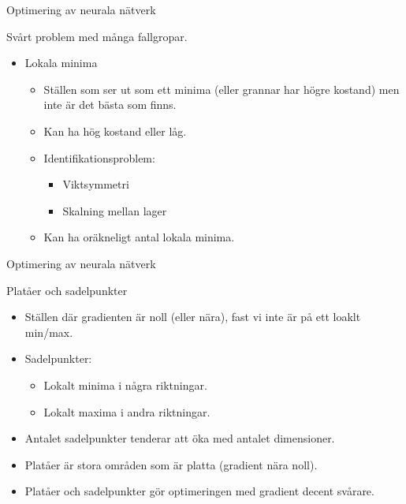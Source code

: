 \documentclass[10pt,english]{beamer}
\begin{document}
\begin{frame}{Optimering av neurala nätverk}
    
    Svårt problem med många fallgropar.

    \begin{itemize}
        \item Lokala minima
        \begin{itemize}
            \item Ställen som ser ut som ett minima (eller grannar har högre kostand) men inte är det bästa som finns.
            \item Kan ha hög kostand eller låg.
            \item Identifikationsproblem:
            \begin{itemize}
                \item Viktsymmetri
                \item Skalning mellan lager
            \end{itemize}
            \item Kan ha oräkneligt antal lokala minima.
        \end{itemize}
    \end{itemize}

\end{frame}

\begin{frame}{Optimering av neurala nätverk}
    
    Platåer och sadelpunkter
    \begin{itemize}
        \item Ställen där gradienten är noll (eller nära), fast vi inte är på ett loaklt min/max.
        \item Sadelpunkter:
        \begin{itemize}
            \item Lokalt minima i några riktningar.
            \item Lokalt maxima i andra riktningar.
        \end{itemize}
        \item Antalet sadelpunkter tenderar att öka med antalet dimensioner.
        \item Platåer är stora områden som är platta (gradient nära noll).
        \item Platåer och sadelpunkter gör optimeringen med gradient decent svårare.
    \end{itemize}

\end{frame}
\end{document}

